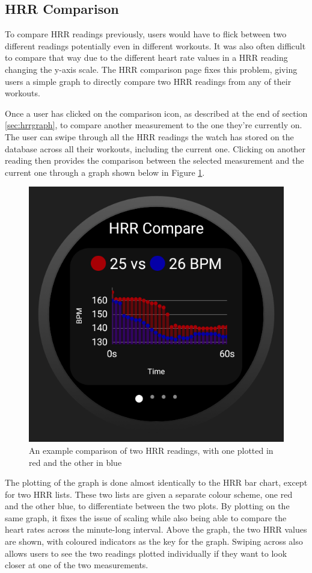 \documentclass{l4proj}
\begin{document}
\subsection{HRR Comparison}
\label{sec:hrrcomparison}

To compare HRR readings previously, users would have to flick between two different readings potentially even in different workouts. It was also often difficult to compare that way due to the different heart rate values in a HRR reading changing the y-axis scale. The HRR comparison page fixes this problem, giving users a simple graph to directly compare two HRR readings from any of their workouts.

Once a user has clicked on the comparison icon, as described at the end of section \ref{sec:hrrgraph}, to compare another measurement to the one they're currently on. The user can swipe through all the HRR readings the watch has stored on the database across all their workouts, including the current one. Clicking on another reading then provides the comparison between the selected measurement and the current one through a graph shown below in Figure \ref{fig:hrrcompare}.

\begin{figure}[h!]
    \centering
    \includegraphics[width=0.4\linewidth]{dissertation//dissImages/HRRCompareGraph.png}
    \caption{An example comparison of two HRR readings, with one plotted in red and the other in blue}
    \label{fig:hrrcompare}
\end{figure}

The plotting of the graph is done almost identically to the HRR bar chart, except for two HRR lists. These two lists are given a separate colour scheme, one red and the other blue, to differentiate between the two plots. By plotting on the same graph, it fixes the issue of scaling while also being able to compare the heart rates across the minute-long interval. Above the graph, the two HRR values are shown, with coloured indicators as the key for the graph. Swiping across also allows users to see the two readings plotted individually if they want to look closer at one of the two measurements.
\end{document}
